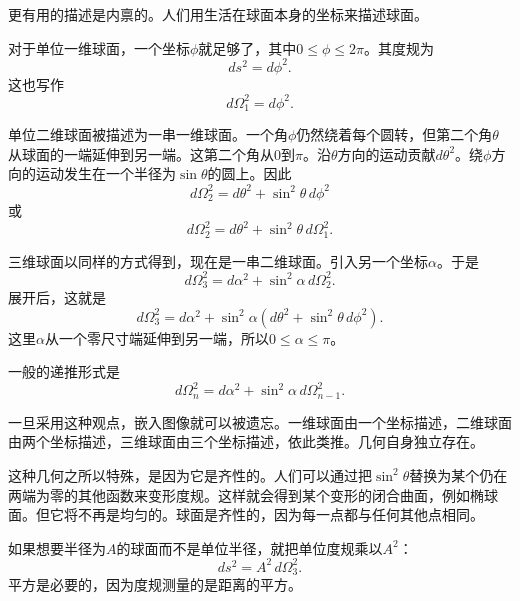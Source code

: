 更有用的描述是内禀的。人们用生活在球面本身的坐标来描述球面。

对于单位一维球面，一个坐标\(\phi\)就足够了，其中\(0\leq \phi \leq 2\pi\)。其度规为
\begin{equation}
ds^2=d\phi^2.
\end{equation}
这也写作
\begin{equation}
d\Omega_1^2=d\phi^2.
\end{equation}

单位二维球面被描述为一串一维球面。一个角\(\phi\)仍然绕着每个圆转，但第二个角\(\theta\)从球面的一端延伸到另一端。这第二个角从\(0\)到\(\pi\)。沿\(\theta\)方向的运动贡献\(d\theta^2\)。绕\(\phi\)方向的运动发生在一个半径为\(\sin\theta\)的圆上。因此
\begin{equation}
d\Omega_2^2=d\theta^2+\sin^2\theta\,d\phi^2
\end{equation}
或
\begin{equation}
d\Omega_2^2=d\theta^2+\sin^2\theta\,d\Omega_1^2.
\end{equation}

三维球面以同样的方式得到，现在是一串二维球面。引入另一个坐标\(\alpha\)。于是
\begin{equation}
d\Omega_3^2=d\alpha^2+\sin^2\alpha\,d\Omega_2^2.
\end{equation}
展开后，这就是
\begin{equation}
d\Omega_3^2=d\alpha^2+\sin^2\alpha\left(d\theta^2+\sin^2\theta\,d\phi^2\right).
\end{equation}
这里\(\alpha\)从一个零尺寸端延伸到另一端，所以\(0\leq \alpha \leq \pi\)。

一般的递推形式是
\begin{equation}
d\Omega_n^2=d\alpha^2+\sin^2\alpha\,d\Omega_{n-1}^2.
\end{equation}

一旦采用这种观点，嵌入图像就可以被遗忘。一维球面由一个坐标描述，二维球面由两个坐标描述，三维球面由三个坐标描述，依此类推。几何自身独立存在。

这种几何之所以特殊，是因为它是齐性的。人们可以通过把\(\sin^2\theta\)替换为某个仍在两端为零的其他函数来变形度规。这样就会得到某个变形的闭合曲面，例如椭球面。但它将不再是均匀的。球面是齐性的，因为每一点都与任何其他点相同。

如果想要半径为\(A\)的球面而不是单位半径，就把单位度规乘以\(A^2\)：
\begin{equation}
ds^2=A^2\,d\Omega_3^2.
\end{equation}
平方是必要的，因为度规测量的是距离的平方。

